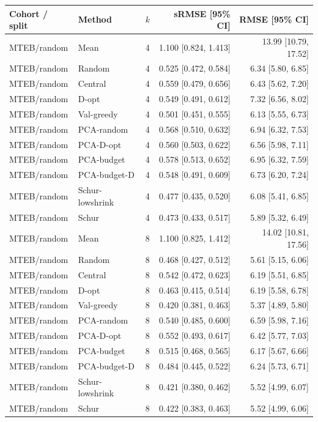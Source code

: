 \begin{longtable}{lllrr}
\toprule Cohort / split & Method & $k$ & sRMSE [95\% CI] & RMSE [95\% CI]\\\midrule\endhead
MTEB/random & Mean & 4 & 1.100 [0.824, 1.413] & 13.99 [10.79, 17.52]\\
MTEB/random & Random & 4 & 0.525 [0.472, 0.584] & 6.34 [5.80, 6.85]\\
MTEB/random & Central & 4 & 0.559 [0.479, 0.656] & 6.43 [5.62, 7.20]\\
MTEB/random & D-opt & 4 & 0.549 [0.491, 0.612] & 7.32 [6.56, 8.02]\\
MTEB/random & Val-greedy & 4 & 0.501 [0.451, 0.555] & 6.13 [5.55, 6.73]\\
MTEB/random & PCA-random & 4 & 0.568 [0.510, 0.632] & 6.94 [6.32, 7.53]\\
MTEB/random & PCA-D-opt & 4 & 0.560 [0.503, 0.622] & 6.56 [5.98, 7.11]\\
MTEB/random & PCA-budget & 4 & 0.578 [0.513, 0.652] & 6.95 [6.32, 7.59]\\
MTEB/random & PCA-budget-D & 4 & 0.548 [0.491, 0.609] & 6.73 [6.20, 7.24]\\
MTEB/random & Schur-lowshrink & 4 & 0.477 [0.435, 0.520] & 6.08 [5.41, 6.85]\\
MTEB/random & Schur & 4 & 0.473 [0.433, 0.517] & 5.89 [5.32, 6.49]\\
MTEB/random & Mean & 8 & 1.100 [0.825, 1.412] & 14.02 [10.81, 17.56]\\
MTEB/random & Random & 8 & 0.468 [0.427, 0.512] & 5.61 [5.15, 6.06]\\
MTEB/random & Central & 8 & 0.542 [0.472, 0.623] & 6.19 [5.51, 6.85]\\
MTEB/random & D-opt & 8 & 0.463 [0.415, 0.514] & 6.19 [5.58, 6.78]\\
MTEB/random & Val-greedy & 8 & 0.420 [0.381, 0.463] & 5.37 [4.89, 5.80]\\
MTEB/random & PCA-random & 8 & 0.540 [0.485, 0.600] & 6.59 [5.98, 7.16]\\
MTEB/random & PCA-D-opt & 8 & 0.552 [0.493, 0.617] & 6.42 [5.77, 7.03]\\
MTEB/random & PCA-budget & 8 & 0.515 [0.468, 0.565] & 6.17 [5.67, 6.66]\\
MTEB/random & PCA-budget-D & 8 & 0.484 [0.445, 0.522] & 6.24 [5.73, 6.71]\\
MTEB/random & Schur-lowshrink & 8 & 0.421 [0.380, 0.462] & 5.52 [4.99, 6.07]\\
MTEB/random & Schur & 8 & 0.422 [0.383, 0.463] & 5.52 [4.99, 6.06]\\

\end{longtable}
